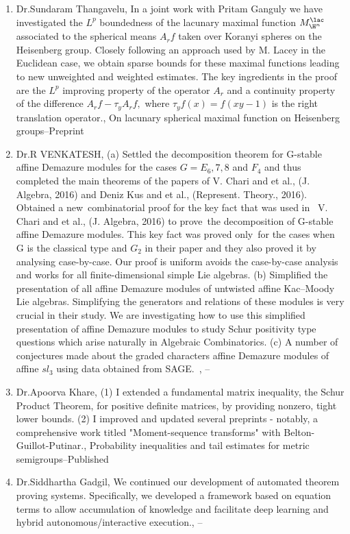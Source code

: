 \begin{enumerate}
\item Dr.Sundaram Thangavelu, In a joint work with Pritam Ganguly  we have investigated the $ L^p $  boundedness of the lacunary maximal function $ M_{\H^n}^\lac $ associated to the spherical means $ A_r f$  taken over Koranyi spheres on the Heisenberg group. Closely following an approach used by M. Lacey in the Euclidean case, we obtain sparse bounds for these maximal functions leading to new unweighted and weighted estimates. The key ingredients in the proof are the $L^p$  improving property of the operator $ A_r $  and a continuity property of the difference $ A_r f−\tau_y A_r f,$ where $\tau_yf(x)=f(xy−1) $ is the right translation operator., On lacunary spherical maximal function on Heisenberg groups--Preprint
\item Dr.R VENKATESH, (a) Settled the decomposition theorem for G-stable affine Demazure modules for the cases $G = E_6,7,8$ and $F_4$ and thus completed the main theorems of the papers of V. Chari and et al., (J. Algebra, 2016) and Deniz Kus and et al., (Represent. Theory., 2016). Obtained a new combinatorial proof for the key fact that was used in  V. Chari and et al., (J. Algebra, 2016) to prove the decomposition of G-stable affine Demazure modules. This key fact was proved only for the cases when G is the classical type and $G_2$ in their paper and they also proved it by analysing case-by-case. Our proof is uniform avoids the case-by-case analysis and works for all finite-dimensional simple Lie algebras.  (b) Simplified the presentation of all affine Demazure modules of untwisted affine Kac–Moody Lie algebras. Simplifying the generators and relations of these modules is very crucial in their study. We are investigating how to use this simplified presentation of affine Demazure modules to study Schur positivity type questions which arise naturally in Algebraic Combinatorics.   (c) A number of conjectures made about the graded characters affine Demazure modules of affine $sl_3$ using data obtained from SAGE. , --
\item Dr.Apoorva Khare, (1) I extended a fundamental matrix inequality, the Schur Product Theorem, for positive definite matrices, by providing nonzero, tight lower bounds. (2) I improved and updated several preprints - notably, a comprehensive work titled "Moment-sequence transforms" with Belton-Guillot-Putinar., Probability inequalities and tail estimates for metric semigroups--Published
\item Dr.Siddhartha Gadgil, We continued our development of automated theorem proving systems. Specifically, we developed a framework based on equation terms to allow accumulation of knowledge and facilitate deep learning and hybrid autonomous/interactive execution., --

\end{enumerate}
